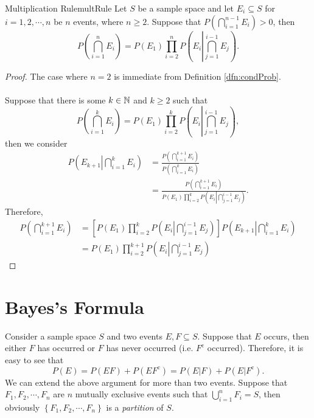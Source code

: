 \documentclass[math]{amznotes}
\theoremstyle{remark}
\begin{document}
\begin{probox}{Multiplication Rule}{multRule}
    Let $S$ be a sample space and let $E_i \subseteq S$ for $i = 1, 2, \cdots, n$ be $n$ events, where $n \geq 2$. Suppose that $P\left(\bigcap_{i = 1}^{n - 1}E_i\right) > 0$, then 
    \begin{equation*}
        P\left(\bigcap_{i = 1}^{n}E_i\right) = P(E_1)\prod_{i = 2}^{n}P\left(E_i\left\lvert\bigcap_{j = 1}^{i - 1}E_j\right.\right).
    \end{equation*}
    \tcblower
    \begin{proof}
        The case where $n = 2$ is immediate from Definition \ref{dfn:condProb}.
        \\\\
        Suppose that there is some $k \in \mathbb{N}$ and $k \geq 2$ such that
        \begin{equation*}
            P\left(\bigcap_{i = 1}^{k}E_i\right) = P(E_1)\prod_{i = 2}^{k}P\left(E_i\left\lvert\bigcap_{j = 1}^{i - 1}E_j\right.\right),
        \end{equation*}
        then we consider
        \begin{align*}
            P\left(E_{k + 1}\left\lvert\bigcap_{i = 1}^{k}E_i\right.\right) & = \frac{P\left(\bigcap_{i = 1}^{k + 1}E_i\right)}{P\left(\bigcap_{i = 1}^{k}E_i\right)} \\
            & = \frac{P\left(\bigcap_{i = 1}^{k + 1}E_i\right)}{P(E_1)\prod_{i = 2}^{k}P\left(E_i\left\lvert\bigcap_{j = 1}^{i - 1}E_j\right.\right)}.
        \end{align*}
        Therefore,
        \begin{align*}
            P\left(\bigcap_{i = 1}^{k + 1}E_i\right) & = \left[P(E_1)\prod_{i = 2}^{k}P\left(E_i\left\lvert\bigcap_{j = 1}^{i - 1}E_j\right.\right)\right]P\left(E_{k + 1}\left\lvert\bigcap_{i = 1}^{k}E_i\right.\right) \\
            & = P(E_1)\prod_{i = 2}^{k + 1}P\left(E_i\left\lvert\bigcap_{j = 1}^{i - 1}E_j\right.\right)
        \end{align*}
    \end{proof}
\end{probox}
\section{Bayes's Formula}
Consider a sample space $S$ and two events $E, F \subseteq S$. Suppose that $E$ occurs, then either $F$ has occurred or $F$ has never occurred (i.e. $F^{\mathrm{c}}$ occurred). Therefore, it is easy to see that
\begin{equation*}
    P(E) = P(EF) + P(EF^{\mathrm{c}}) = P(E|F) + P(E|F^{\mathrm{c}}).
\end{equation*}
We can extend the above argument for more than two events. Suppose that $F_1, F_2, \cdots, F_n$ are $n$ mutually exclusive events such that $\bigcup_{i = 1}^n F_i = S$, then obviously $\left\{F_1, F_2, \cdots, F_n\right\}$ is a \textit{partition} of $S$.
\end{document}
